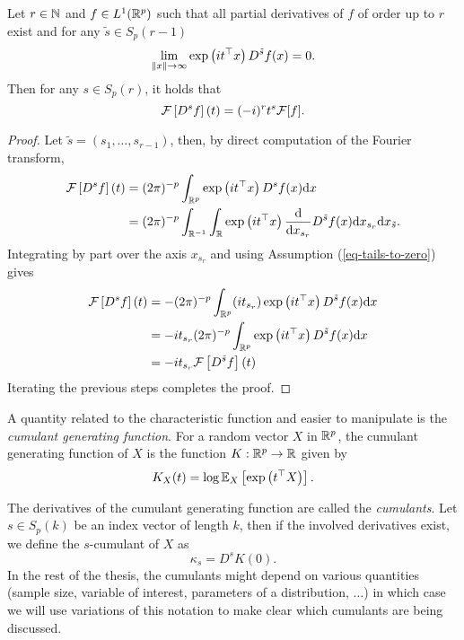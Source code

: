 \begin{lemma} \label{lemma-fourier-derivative}
    Let $r \in \N$ and $f \in L^1(\Rp)$ such that all partial derivatives of $f$ of order up to $r$ exist and for any $\tilde{s} \in S_p(r-1)$
    \begin{equation} \label{eq-tails-to-zero}
        \lim_{\norm{x} \rightarrow \infty} \expf{it^\top x}D^{\tilde{s}}f(x) = 0.
    \end{equation}
    Then for any $s \in S_p(r)$, it holds that
    \begin{equation*}
        \F\left[D^s f \right](t) = (-i)^r t^s \F[f].
    \end{equation*}
\end{lemma}
\begin{proof}
    Let $\tilde{s} = (s_1, \ldots, s_{r-1})$, then, by direct computation of the Fourier transform,
    \begin{align*}
        \F\left[D^s f \right](t) 
        &= (2\pi)^{-p}\intRp{x}{ \expf{it^\top x} D^s f(x) } \\
        &= (2\pi)^{-p}\int_{\R^{-1}} \int_\R 
            \expf{it^\top x} \ddx{x_{s_r}} D^{\tilde{s}} f(x) 
        \d x_{s_r} \d x_{\tilde{s}}.
    \end{align*}
    Integrating by part over the axis $x_{s_r}$ and using Assumption (\ref{eq-tails-to-zero}) gives
    \begin{align*}
        \F\left[D^s f \right](t)  
        &= - (2\pi)^{-p}\intRp{x}{
            (it_{s_r})\expf{it^\top x} D^{\tilde{s}} f(x)
        } \\
        &= -it_{s_r} (2\pi)^{-p}\intRp{x}{
            \expf{it^\top x} D^{\tilde{s}} f(x)
        } \\
        &= -it_{s_r} \F\left[D^{\tilde{s}} f \right](t)
    \end{align*}
    Iterating the previous steps completes the proof.
\end{proof}

A quantity related to the characteristic function and easier to manipulate is the \textit{cumulant generating function}. For a random vector $X$ in $\Rp$, the cumulant generating function of $X$ is the function $K : \Rp \rightarrow \R$ given by
\begin{equation*}
    K_X(t) = \log \expec{X}{\expf{t^\top X}}.
\end{equation*}

The derivatives of the cumulant generating function are called the \textit{cumulants}. Let $s \in S_p(k)$ be an index vector of length $k$, then if the involved derivatives exist, we define the $s$-cumulant of $X$ as
\begin{equation*}
    \kappa_s = D^s K(0).
\end{equation*}
In the rest of the thesis, the cumulants might depend on various quantities (sample size, variable of interest, parameters of a distribution, $\ldots$) in which case we will use variations of this notation to make clear which cumulants are being discussed.

